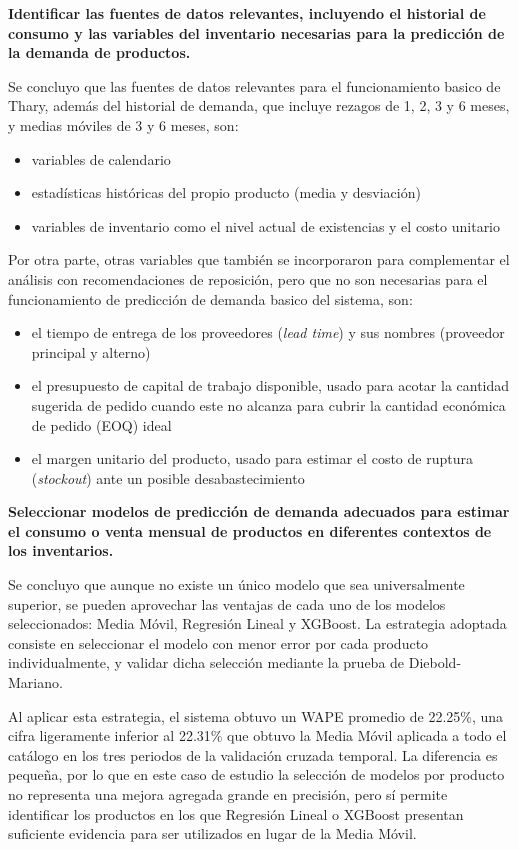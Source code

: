 \textbf{Identificar las fuentes de datos relevantes, incluyendo el historial de consumo y las variables del inventario necesarias para la predicción de la demanda de productos.} 

Se concluyo que las fuentes de datos relevantes para el funcionamiento basico de Thary, además del historial de demanda, que incluye rezagos de 1, 2, 3 y 6 meses, y medias móviles de 3 y 6 meses, son:

\begin{itemize}
    \item variables de calendario
    \item estadísticas históricas del propio producto (media y desviación)
    \item variables de inventario como el nivel actual de existencias y el costo unitario
\end{itemize}

Por otra parte, otras variables que también se incorporaron para complementar el análisis con recomendaciones de reposición, pero que no son necesarias para el funcionamiento de predicción de demanda basico del sistema, son:

\begin{itemize}
    \item el tiempo de entrega de los proveedores (\textit{lead time}) y sus nombres (proveedor principal y alterno)
    \item el presupuesto de capital de trabajo disponible, usado para acotar la cantidad sugerida de pedido cuando este no alcanza para cubrir la cantidad económica de pedido (EOQ) ideal
    \item el margen unitario del producto, usado para estimar el costo de ruptura (\textit{stockout}) ante un posible desabastecimiento
\end{itemize}

\textbf{Seleccionar modelos de predicción de demanda adecuados para estimar el consumo o venta mensual de productos en diferentes contextos de los inventarios.} 

Se concluyo que aunque no existe un único modelo que sea universalmente superior, se pueden aprovechar las ventajas de cada uno de los modelos seleccionados: Media Móvil, Regresión Lineal y XGBoost. La estrategia adoptada consiste en seleccionar el modelo con menor error por cada producto individualmente, y validar dicha selección mediante la prueba de Diebold-Mariano.

Al aplicar esta estrategia, el sistema obtuvo un WAPE promedio de 22.25\%, una cifra ligeramente inferior al 22.31\% que obtuvo la Media Móvil aplicada a todo el catálogo en los tres periodos de la validación cruzada temporal. La diferencia es pequeña, por lo que en este caso de estudio la selección de modelos por producto no representa una mejora agregada grande en precisión, pero sí permite identificar los productos en los que Regresión Lineal o XGBoost presentan suficiente evidencia para ser utilizados en lugar de la Media Móvil.


